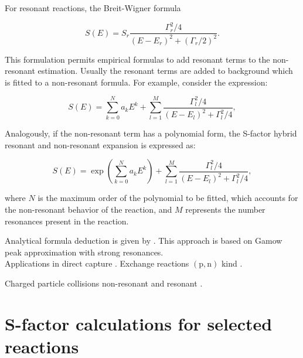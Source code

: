 \documentclass[openany]{book}
\begin{document}


For resonant reactions, the Breit-Wigner formula

\begin{equation} \label{eq:empirical_breitWigner}
	S(E) = S_r \frac{\Gamma^2_r/4}{(E-E_r)^2 + (\Gamma_r/2)^2}.
\end{equation}

This formulation permits empirical formulas to add resonant terms to the non-resonant estimation. Usually the resonant terms are added to background which is fitted to a non-resonant formula. For example, consider the expression: 

\begin{equation}  \label{eq:empirical_hybridPolynomial}
	S(E) =  \sum _{k = 0}^{N} {a_kE^k} + \sum_{l = 1}^{M} {\frac{\Gamma_l^2/4}{(E - E_l)^2 + \Gamma_l^2/4}},
\end{equation}

Analogously, if the non-resonant term has a polynomial form, the S-factor hybrid resonant and non-resonant expansion is expressed as:

\begin{equation}  \label{eq:empirical_hybridExponential}
	S(E) =  \exp { \left( \sum _{k = 0}^{N} {a_kE^k} \right) } + \sum_{l = 1}^{M} {\frac{\Gamma_l^2/4}{(E - E_l)^2 + \Gamma_l^2/4}},
\end{equation}

where $N$ is the maximum order of the polynomial to be fitted, which accounts for the non-resonant behavior of the reaction, and $M$ represents the number resonances present in the reaction. 

Analytical formula deduction is given by \cite{kimura_bonasera_2013}. This approach is based on Gamow peak approximation with strong resonances. \\

Applications in direct capture \cite{jennings_karataglidis_shoppa_1998}.  Exchange reactions $\mathrm{(p, n)}$ kind \cite{hussein_abdullah_2020}.

Charged particle collisions non-resonant \cite{ueda_sargeant_pato_hussein_2002} and resonant \cite{ueda_sargeant_pato_hussein_2004}. \\


\chapter{S-factor calculations for selected reactions} \label{ch:sfactorCalculations}
\end{document}
